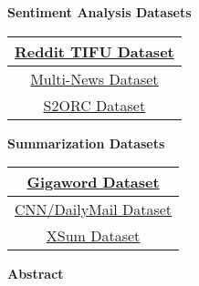 \begin{multicols}{2}
    \begin{center}
        \begin{large}
            \noindent\textbf{Sentiment Analysis Datasets}
        \end{large}
    \end{center}

    \begin{center}
        \begin{tabular}{|c|}
            \hline
            \href{https://paperswithcode.com/dataset/reddit-tifu}{Reddit TIFU Dataset\cite{RedditTIFU}} \\ \hline
            \href{https://paperswithcode.com/dataset/multi-news}{Multi-News Dataset\cite{Multinews}} \\ \hline
            \href{https://paperswithcode.com/dataset/s2orc}{S2ORC Dataset\cite{S2ORC}} \\ \hline
        \end{tabular}
    \end{center}

    \begin{center}
        \begin{large}
            \noindent\textbf{Summarization Datasets}
        \end{large}
    \end{center}

    \begin{center}
        \begin{tabular}{|c|}
            \hline
            \href{https://huggingface.co/datasets/gigaword}{Gigaword Dataset\cite{Gigaword1,Gigaword2}} \\ \hline
            \href{https://huggingface.co/datasets/cnn_dailymail}{CNN/DailyMail Dataset\cite{CNNDM}} \\ \hline
            \href{https://huggingface.co/datasets/xsum}{XSum Dataset\cite{XSumDataset}} \\ \hline
        \end{tabular}
    \end{center}

\end{multicols}

\vspace{5pt}

\begin{large}
    \noindent\textbf{Abstract}
\end{large}

\vspace{5pt}

